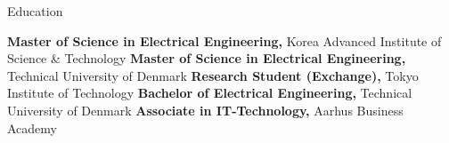 \begin{rubric}{\faGraduationCap[solid] Education}

\entry*[2021 -- 2023][]%
	\textbf{Master of Science in Electrical Engineering,} Korea Advanced Institute of Science \& Technology
%
\entry*[2021 -- 2023][]%
	\textbf{Master of Science in Electrical Engineering,} Technical University of Denmark
% 
\entry*[2020][]%
	\textbf{Research Student (Exchange),} Tokyo Institute of Technology
%
\entry*[2018 -- 2020][]%
	\textbf{Bachelor of Electrical Engineering,} Technical University of Denmark
% 
\entry*[2013 -- 2015][]%
	\textbf{Associate in IT-Technology,} Aarhus Business Academy 
% 
\end{rubric}